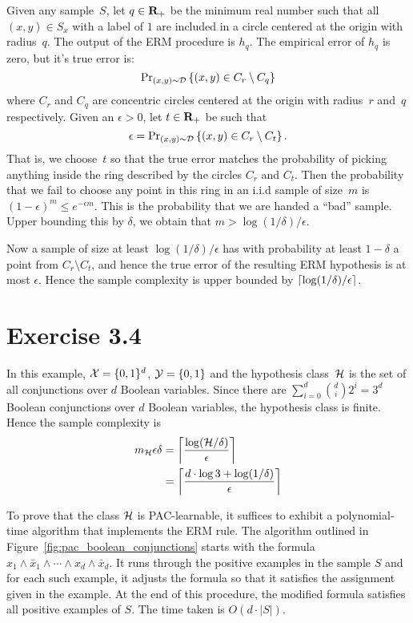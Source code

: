 Given any sample~$S$, let $q \in \mathbf{R}_{+}$ be the minimum real number such that
all $(x, y) \in S_x$ with a label of $1$ are included in a circle centered at
the origin with radius~$q$. The output of the ERM procedure is $h_q$. The
empirical error of $h_q$ is zero, but it's true error is:
\[
	\text{Pr}_{(x, y) \sim \mathcal{D}} \left \{ (x, y) \in C_r \setminus C_q \right \}
\]
where $C_r$ and $C_q$ are concentric circles centered at the origin with
radius~$r$ and~$q$ respectively. Given an $\epsilon > 0$, let $t \in \mathbf{R}_{+}$ be
such that $$\epsilon = \text{Pr}_{(x, y) \sim \mathcal{D}} \left \{ (x, y) \in C_r \setminus
C_t \right \}.$$ That is, we choose~$t$ so that the true error matches the probability
of picking anything inside the ring described by the circles $C_r$ and $C_t$.
Then the probability that we fail to choose any point in this ring in an i.i.d
sample of size~$m$ is $(1 - \epsilon)^m \leq e^{- \epsilon m}$. This is the
probability that we are handed a ``bad'' sample. Upper bounding this by
$\delta$, we obtain that $m > \log(1 / \delta) / \epsilon$.

Now a sample of size at least $\log(1 / \delta) / \epsilon$ has with
probability at least $1 - \delta$ a point from $C_r \setminus C_t$, and hence
the true error of the resulting ERM hypothesis is at most $\epsilon$. Hence the
sample complexity is upper bounded by $\left \lceil \log(1 / \delta) / \epsilon \right \rceil$.

\section*{Exercise 3.4}

In this example, $\mathcal{X} = \{0, 1\}^d$, $\mathcal{Y} = \{0, 1\}$ and the hypothesis
class~$\mathcal{H}$ is the set of all conjunctions over $d$ Boolean variables.
Since there are $\sum_{i = 0}^{d} {d \choose i} 2^i = 3^{d}$ Boolean
conjunctions over $d$ Boolean variables, the hypothesis class is finite. Hence
the sample complexity is 
\begin{align*}
	m_{\mathcal{H}}{\epsilon}{\delta} & = \left \lceil \frac{\log (\mathcal{H} / \delta)}{\epsilon} \right \rceil \\
	& = \left \lceil \frac{d \cdot \log 3 + \log (1 / \delta)}{\epsilon} \right \rceil
\end{align*}

To prove that the class $\mathcal{H}$ is PAC-learnable, it suffices to exhibit a
polynomial-time algorithm that implements the ERM rule. The algorithm outlined
in Figure~\ref{fig:pac_boolean_conjunctions} starts with the formula $x_1 \land
\bar{x}_1 \land \cdots \land x_d \land \bar{x}_d$. It runs through the positive
examples in the sample $S$ and for each such example, it adjusts the formula so
that it satisfies the assignment given in the example. At the end of this
procedure, the modified formula satisfies all positive examples of $S$. The
time taken is $O(d \cdot |S|)$. 

